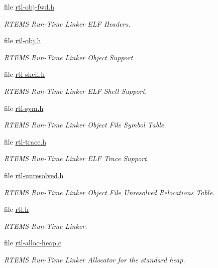 \begin{DoxyCompactItemize}
file \mbox{\hyperlink{rtl-obj-fwd_8h}{rtl-\/obj-\/fwd.\+h}}
\begin{DoxyCompactList}\small\item\em R\+T\+E\+MS Run-\/\+Time Linker E\+LF Headers. \end{DoxyCompactList}\item 
file \mbox{\hyperlink{rtl-obj_8h}{rtl-\/obj.\+h}}
\begin{DoxyCompactList}\small\item\em R\+T\+E\+MS Run-\/\+Time Linker Object Support. \end{DoxyCompactList}\item 
file \mbox{\hyperlink{rtl-shell_8h}{rtl-\/shell.\+h}}
\begin{DoxyCompactList}\small\item\em R\+T\+E\+MS Run-\/\+Time Linker E\+LF Shell Support. \end{DoxyCompactList}\item 
file \mbox{\hyperlink{rtl-sym_8h}{rtl-\/sym.\+h}}
\begin{DoxyCompactList}\small\item\em R\+T\+E\+MS Run-\/\+Time Linker Object File Symbol Table. \end{DoxyCompactList}\item 
file \mbox{\hyperlink{rtl-trace_8h}{rtl-\/trace.\+h}}
\begin{DoxyCompactList}\small\item\em R\+T\+E\+MS Run-\/\+Time Linker E\+LF Trace Support. \end{DoxyCompactList}\item 
file \mbox{\hyperlink{rtl-unresolved_8h}{rtl-\/unresolved.\+h}}
\begin{DoxyCompactList}\small\item\em R\+T\+E\+MS Run-\/\+Time Linker Object File Unresolved Relocations Table. \end{DoxyCompactList}\item 
file \mbox{\hyperlink{rtl_8h}{rtl.\+h}}
\begin{DoxyCompactList}\small\item\em R\+T\+E\+MS Run-\/\+Time Linker. \end{DoxyCompactList}\item 
file \mbox{\hyperlink{rtl-alloc-heap_8c}{rtl-\/alloc-\/heap.\+c}}
\begin{DoxyCompactList}\small\item\em R\+T\+E\+MS Run-\/\+Time Linker Allocator for the standard heap. \end{DoxyCompactList}\item 

\end{DoxyCompactItemize}
